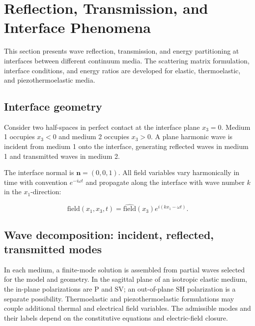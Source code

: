 \section{Reflection, Transmission, and Interface Phenomena}
\label{sec:interfaces}

This section presents wave reflection, transmission, and energy partitioning at interfaces between different continuum media. The scattering matrix formulation, interface conditions, and energy ratios are developed for elastic, thermoelastic, and piezothermoelastic media.

\subsection{Interface geometry}
\label{sec:9.1}

Consider two half-spaces in perfect contact at the interface plane $x_3 = 0$. Medium 1 occupies $x_3 < 0$ and medium 2 occupies $x_3 > 0$. A plane harmonic wave is incident from medium 1 onto the interface, generating reflected waves in medium 1 and transmitted waves in medium 2.

The interface normal is $\bm{n} = (0, 0, 1)$. All field variables vary harmonically in time with convention $e^{-i\omega t}$ and propagate along the interface with wave number $k$ in the $x_1$-direction:

\begin{equation}
\text{field}(x_1, x_3, t) = \hat{\text{field}}(x_3) e^{i(kx_1 - \omega t)}.
\label{eq:9.1}
\end{equation}

\subsection{Wave decomposition: incident, reflected, transmitted modes}
\label{sec:9.2}

In each medium, a finite-mode solution is assembled from partial waves selected for the model and geometry. In the sagittal plane of an isotropic elastic medium, the in-plane polarizations are P and SV; an out-of-plane SH polarization is a separate possibility. Thermoelastic and piezothermoelastic formulations may couple additional thermal and electrical field variables. The admissible modes and their labels depend on the constitutive equations and electric-field closure.

